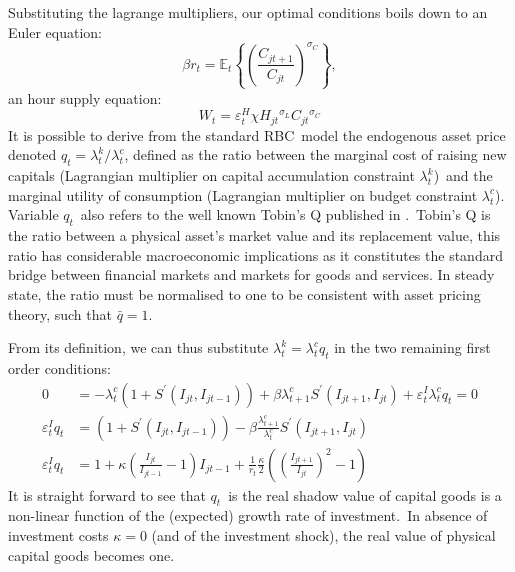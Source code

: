 \documentclass[a4paper,12pt]{article}%
\begin{document}
Substituting the lagrange multipliers, our optimal conditions boils down to an
Euler equation:
\begin{equation}
\beta r_{t}=\mathbb{E}_{t}\left\{  \left(  \frac{C_{jt+1}}{C_{jt}}\right)
^{\sigma_{C}}\right\}  , \label{eq household Euler}%
\end{equation}
an hour supply equation:%
\begin{equation}
W_{t}=\varepsilon_{t}^{H}\chi H_{jt}{}^{\sigma_{L}}C_{jt}{}^{\sigma_{C}}
\label{eq household labor supply}%
\end{equation}
It is possible to derive from the standard RBC\ model the endogenous asset
price denoted $q_{t}=\lambda_{t}^{k}/\lambda_{t}^{c}$, defined as the ratio
between the marginal cost of raising new capitals (Lagrangian multiplier on
capital accumulation constraint $\lambda_{t}^{k}$)\ and the marginal utility
of consumption (Lagrangian multiplier on budget constraint $\lambda_{t}^{c}$).
Variable $q_{t}$\ also refers to the well known Tobin's Q published in
\cite{tobin1969general}.\ Tobin's Q is the ratio between a physical asset's
market value and its replacement value, this ratio has considerable
macroeconomic implications as it constitutes the standard bridge between
financial markets and markets for goods and services. In steady state, the
ratio must be normalised to one to be consistent with asset pricing theory,
such that $\bar{q}=1$.

From its definition, we can thus substitute $\lambda_{t}^{k}=\lambda_{t}%
^{c}q_{t}$ in the two remaining first order conditions:%
\begin{align}
0  &  =-\lambda_{t}^{c}\left(  1+S^{\prime}\left(  I_{jt},I_{jt-1}\right)
\right)  +\beta\lambda_{t+1}^{c}S^{\prime}\left(  I_{jt+1},I_{jt}\right)
+\varepsilon_{t}^{I}\lambda_{t}^{c}q_{t}=0\label{FOC 3}\\
\varepsilon_{t}^{I}q_{t}  &  =\left(  1+S^{\prime}\left(  I_{jt}%
,I_{jt-1}\right)  \right)  -\beta\frac{\lambda_{t+1}^{c}}{\lambda_{t}^{c}%
}S^{\prime}\left(  I_{jt+1},I_{jt}\right) \\
\varepsilon_{t}^{I}q_{t}  &  =1+\kappa\left(  \frac{I_{jt}}{I_{jt-1}%
}-1\right)  I_{jt-1}+\frac{1}{r_{t}}\frac{\kappa}{2}\left(  \left(
\frac{I_{jt+1}}{I_{jt}}\right)  ^{2}-1\right)
\end{align}
It is straight forward to see that $q_{t}$\ is the real shadow value of
capital goods is a non-linear function of the (expected) growth rate of
investment.\ In absence of investment costs $\kappa=0$ (and of the investment
shock), the real value of physical capital goods becomes one.
\end{document}
